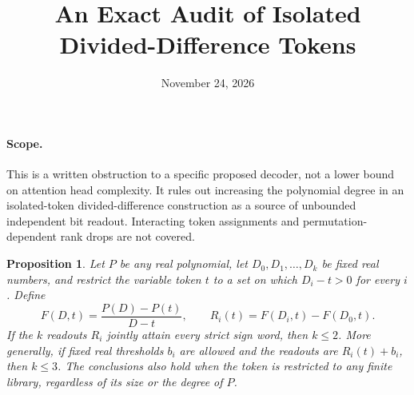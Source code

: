 \documentclass[11pt]{article}
\title{An Exact Audit of Isolated Divided-Difference Tokens}
\author{}
\date{November 24, 2026}
\newtheorem{proposition}{Proposition}
\begin{document}
\maketitle

\paragraph{Scope.}
This is a written obstruction to a specific proposed decoder, not a
lower bound on attention head complexity. It rules out increasing the
polynomial degree in an isolated-token divided-difference construction
as a source of unbounded independent bit readout. Interacting token
assignments and permutation-dependent rank drops are not covered.

\begin{proposition}
Let $P$ be any real polynomial, let $D_0,D_1,\ldots,D_k$ be fixed real
numbers, and restrict the variable token $t$ to a set on which
$D_i-t>0$ for every $i$. Define
\[
 F(D,t)=\frac{P(D)-P(t)}{D-t},\qquad
 R_i(t)=F(D_i,t)-F(D_0,t).
\]
If the $k$ readouts $R_i$ jointly attain every strict sign word, then
$k\leq2$. More generally, if fixed real thresholds $b_i$ are allowed
and the readouts are $R_i(t)+b_i$, then $k\leq3$.
The conclusions also hold when the token is restricted to any finite
library, regardless of its size or the degree of $P$.
\end{proposition}
\end{document}
